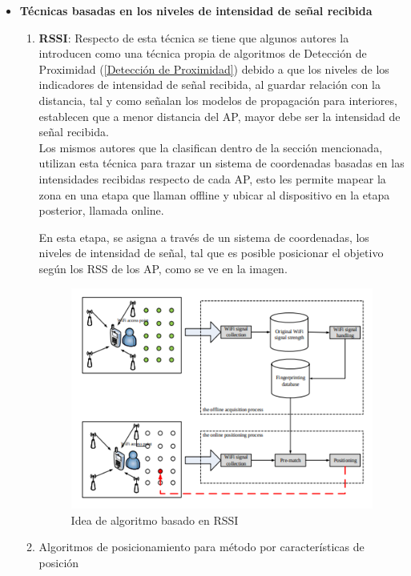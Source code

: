 \begin{itemize}
    \item{\textbf{Técnicas basadas en los niveles de intensidad de señal recibida}
    \begin{enumerate}
        \item{\textbf{\ac{RSSI}}: Respecto de esta técnica se tiene que algunos autores la introducen como una técnica propia de algoritmos de Detección de Proximidad (\ref{Detección de Proximidad}}) debido a que los niveles de los indicadores de intensidad de señal recibida, al guardar relación con la distancia, tal y como señalan los modelos de propagación para interiores, establecen que a menor distancia del AP, mayor debe ser la intensidad de señal recibida.\\
        
        Los mismos autores que la clasifican dentro de la sección mencionada, utilizan esta técnica para trazar un sistema de coordenadas basadas en las intensidades recibidas respecto de cada AP, esto les permite mapear la zona en una etapa que llaman offline y ubicar al dispositivo en la etapa posterior, llamada online.\ \
            
        En esta etapa, se asigna a través de un sistema de coordenadas, los niveles de intensidad de señal, tal que es posible posicionar el objetivo según los RSS de los AP, como se ve en la imagen.
            
        \begin{figure}[h!]
            \centering
            \includegraphics[scale = 0.6]{./images/rssi}
            \caption{Idea de algoritmo basado en RSSI}
            \label{fig:RSSI}
        \end{figure}
        
        \item{Algoritmos de posicionamiento para método por características de posición}\\
        

\end{enumerate}}
\end{itemize}
